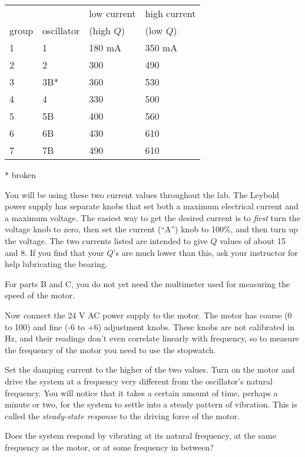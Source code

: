 \begin{tabular}{llll}
      &              & low current & high current \\
group & oscillator   & (high $Q$)  &    (low $Q$)\\
1     &      1       &   180  mA   &    350 mA \\
2     &      2       &   300       &    490  \\
3     &      3B*      &   360       &    530 \\
4     &      4       &   330       &    500  \\
5     &      5B      &   400       &    560 \\
6     &      6B      &   430       &    610  \\
7     &      7B      &   490       &    610  
\end{tabular}
* broken

You will be using these two current
values throughout the lab.
The Leybold power supply has separate knobs that set both a maximum electrical
current and a maximum voltage. The easiest way to get the desired current is to
\emph{first} turn the voltage knob to zero, then set the current (``A'') knob
to 100\%, and then turn up the voltage. The two currents listed are intended
to give $Q$ values of about 15 and 8. If you find that your $Q$'s are much
lower than this, ask your instructor for help lubricating the bearing.

For parts B and C, you do not yet need the multimeter used for measuring the speed of the motor.


Now connect the 24 V AC power supply to the motor.
The motor has coarse (0 to 100) and fine (-6 to +6) adjustment knobs.
These knobs are not
calibrated in Hz, and their readings don't even correlate linearly with
frequency, so to measure the frequency of the motor you need to use the stopwatch.

Set the damping current to the higher of the two values.
Turn on the motor and drive the system at a frequency very
different from the oscillator's natural frequency. You will notice that
it takes a certain amount of time, perhaps a minute or two,
for the system to settle into a steady pattern of vibration.
This is called the \emph{steady-state response}
 to the driving force of the motor.

Does the system respond by vibrating at its natural
frequency, at the same frequency as the motor, or at some
frequency in between?

